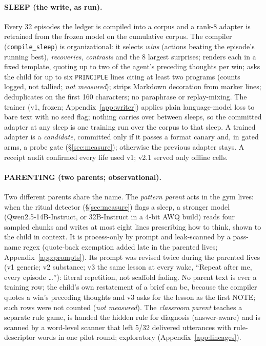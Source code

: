 \documentclass{article}
\newcommand{\nm}{\emph{not measured}}
\begin{document}
\paragraph{SLEEP (the write, as run).} Every 32 episodes the ledger is compiled into a corpus and a rank-8 adapter is retrained from the frozen model on the cumulative corpus. The compiler (\texttt{compile\_sleep}) is organizational: it selects \emph{wins} (actions beating the episode's running best), \emph{recoveries}, \emph{contrasts} and the 8 largest surprises; renders each in a fixed template, quoting up to two of the agent's preceding thoughts per win; asks the child for up to six \texttt{PRINCIPLE} lines citing at least two programs (counts logged, not tallied; \nm); strips Markdown decoration from marker lines; deduplicates on the first 160 characters; no paraphrase or replay-mixing. The trainer (v1, frozen; Appendix~\ref{app:writer}) applies plain language-model loss to bare text with no seed flag; nothing carries over between sleeps, so the committed adapter at any sleep is one training run over the corpus to that sleep. A trained adapter is a \emph{candidate}, committed only if it passes a format canary and, in gated arms, a probe gate (\S\ref{sec:measure}); otherwise the previous adapter stays. A receipt audit confirmed every life used v1; v2.1 served only offline cells.

\paragraph{PARENTING (two parents; observational).} Two different parents share the name. The \emph{pattern parent} acts in the gym lives: when the ritual detector (\S\ref{sec:measure}) flags a sleep, a stronger model (Qwen2.5-14B-Instruct, or 32B-Instruct in a 4-bit AWQ build) reads four sampled chunks and writes at most eight lines prescribing how to think, shown to the child in context. It is process-only by prompt and leak-scanned by a pass-name regex (quote-back exemption added late in the parented lives; Appendix~\ref{app:prompts}). Its prompt was revised twice during the parented lives (v1 generic; v2 substance; v3 the same lesson at every wake, ``Repeat after me, every episode \ldots''): literal repetition, not scaffold fading. No parent text is ever a training row; the child's own restatement of a brief can be, because the compiler quotes a win's preceding thoughts and v3 asks for the lesson as the first NOTE; such rows were not counted (\nm). The \emph{classroom parent} teaches a separate rule game, is handed the hidden rule for diagnosis (answer-aware) and is scanned by a word-level scanner that left 5/32 delivered utterances with rule-descriptor words in one pilot round; exploratory (Appendix~\ref{app:lineages}).
\end{document}
